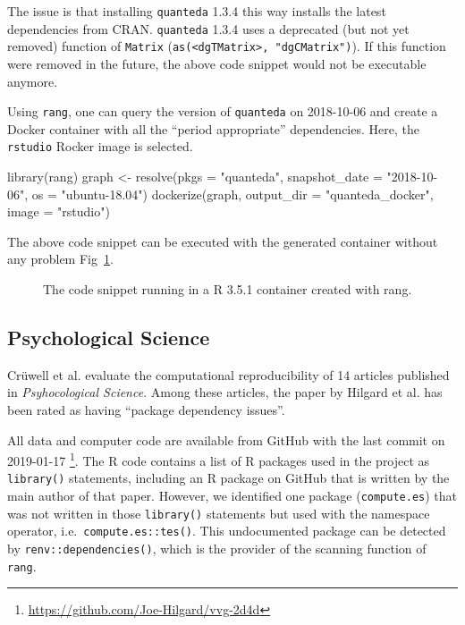 \documentclass[
  10pt,
  letterpaper,
]{article}
\newenvironment{Shaded}{\begin{snugshade}}{\end{snugshade}}
\newcommand{\AttributeTok}[1]{\textcolor[rgb]{0.40,0.45,0.13}{#1}}
\newcommand{\FunctionTok}[1]{\textcolor[rgb]{0.28,0.35,0.67}{#1}}
\newcommand{\NormalTok}[1]{\textcolor[rgb]{0.00,0.23,0.31}{#1}}
\newcommand{\OtherTok}[1]{\textcolor[rgb]{0.00,0.23,0.31}{#1}}
\newcommand{\StringTok}[1]{\textcolor[rgb]{0.13,0.47,0.30}{#1}}
\begin{document}
The issue is that installing \texttt{quanteda} 1.3.4 this way installs
the latest dependencies from CRAN. \texttt{quanteda} 1.3.4 uses a
deprecated (but not yet removed) function of \texttt{Matrix}
(\texttt{as(\textless{}dgTMatrix\textgreater{},\ "dgCMatrix")}). If this
function were removed in the future, the above code snippet would not be
executable anymore.

Using \texttt{rang}, one can query the version of \texttt{quanteda} on
2018-10-06 and create a Docker container with all the ``period
appropriate'' dependencies. Here, the \texttt{rstudio} Rocker image is
selected.

\begin{Shaded}
\begin{Highlighting}[]
\FunctionTok{library}\NormalTok{(rang)}
\NormalTok{graph }\OtherTok{\textless{}{-}} \FunctionTok{resolve}\NormalTok{(}\AttributeTok{pkgs =} \StringTok{"quanteda"}\NormalTok{,}
                 \AttributeTok{snapshot\_date =} \StringTok{"2018{-}10{-}06"}\NormalTok{,}
                 \AttributeTok{os =} \StringTok{"ubuntu{-}18.04"}\NormalTok{)}
\FunctionTok{dockerize}\NormalTok{(graph, }\AttributeTok{output\_dir =} \StringTok{"quanteda\_docker"}\NormalTok{,}
          \AttributeTok{image =} \StringTok{"rstudio"}\NormalTok{)}
\end{Highlighting}
\end{Shaded}

The above code snippet can be executed with the generated container
without any problem Fig~\ref{fig1}.

\begin{figure}[!h]
\caption{The code snippet running in a R 3.5.1 container created with rang.}
\label{fig1}
\end{figure}

\hypertarget{psychological-science}{%
\subsection{Psychological Science}\label{psychological-science}}

Crüwell et al. \citep{cruewell:2023:WB} evaluate the computational
reproducibility of 14 articles published in \emph{Psyhocological
Science}. Among these articles, the paper by Hilgard et al.
\citep{hilgard:2019:NEG} has been rated as having ``package dependency
issues''.

All data and computer code are available from GitHub with the last
commit on 2019-01-17 \footnote{\url{https://github.com/Joe-Hilgard/vvg-2d4d}}.
The R code contains a list of R packages used in the project as
\texttt{library()} statements, including an R package on GitHub that is
written by the main author of that paper. However, we identified one
package (\texttt{compute.es}) that was not written in those
\texttt{library()} statements but used with the namespace operator,
i.e.~\texttt{compute.es::tes()}. This undocumented package can be
detected by \texttt{renv::dependencies()}, which is the provider of the
scanning function of \texttt{rang}.
\end{document}
